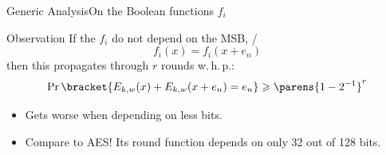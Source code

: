 \begin{frame}{Generic Analysis}{On the Boolean functions $f_i$}
    \vspace{-20pt}
    \begin{minipage}[t][85pt][t]{0.47\textwidth}
        \begin{block}{Observation\vpPp}
            If the $f_i$ do not depend on the MSB, \ie/
            \begin{equation*}
                f_i(x) = f_i(x + e_n)
            \end{equation*}
            then this propagates through $r$ rounds w.\,h.\,p.:
            \begin{equation*}
                \Prob\bracket{E_{k,w}(x) + E_{k,w}(x + e_n) = e_n} \geqslant \parens{1 - 2^{-1}}^r
            \end{equation*}
        \end{block}
    \end{minipage}
    \hfill
    \begin{minipage}[t][85pt][t]{0.47\textwidth}
        \vfill
            \begin{itemize}
                \item Gets worse when depending on less bits.
                \item Compare to AES\@! Its round function depends on only 32 out of 128 bits.
            \end{itemize}
        \vfill
    \end{minipage}

    \vspace{50pt}

    \begin{minipage}{0.985\textwidth}
    \end{minipage}
\end{frame}

